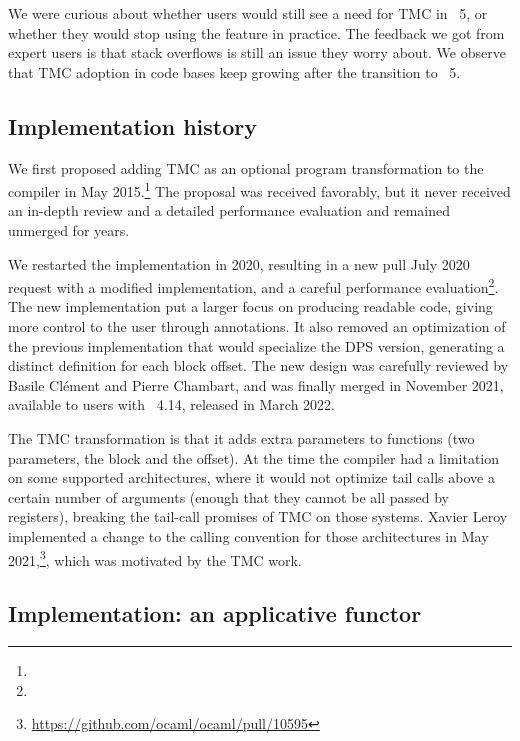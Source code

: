 We were curious about whether users would still see a need for TMC in \OCaml~5, or whether they would stop using the feature in practice.
The feedback we got from expert users is that stack overflows is still an issue they worry about.
We observe that TMC adoption in \OCaml code bases keep growing after the transition to \OCaml~5.

\subsection{Implementation history}
\label{subsec:PR-history}

We first proposed adding TMC as an optional program transformation to
the \OCaml compiler in
May 2015.\footnote{}
The proposal was received favorably, but it never received an in-depth
review and a detailed performance evaluation and remained unmerged for
years.

We restarted the implementation in 2020, resulting in a new pull July 2020 request with a modified implementation, and a careful performance
evaluation\footnote{}. The
new implementation put a larger focus on producing readable code,
giving more control to the user through annotations. It also removed
an optimization of the previous implementation that would specialize
the DPS version, generating a distinct definition for each block
offset. The new design was carefully reviewed by Basile Clément and
Pierre Chambart, and was finally merged in November 2021, available to
users with \OCaml~4.14, released in March 2022.

The TMC transformation is that it adds extra parameters to functions
(two parameters, the block and the offset). At the time the \OCaml
compiler had a limitation on some supported architectures, where it
would not optimize tail calls above a certain number of arguments
(enough that they cannot be all passed by registers), breaking the
tail-call promises of TMC on those systems. Xavier Leroy implemented
a change to the \OCaml calling convention for those architectures in
May 2021,\footnote{\url{https://github.com/ocaml/ocaml/pull/10595}},
which was motivated by the TMC work.

\subsection{Implementation: an applicative functor}
\label{subsec:applicative-impl}

